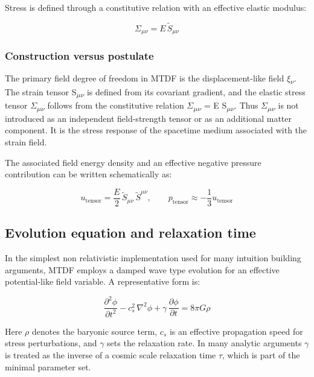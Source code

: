 \documentclass[11pt,a4paper]{article}
\begin{document}
Stress is defined through a constitutive relation with an effective elastic modulus:

\[
\Sigma_{\mu\nu} = E\,\tilde{S}_{\mu\nu}
\]

\begin{mdframed}[linecolor=accent,linewidth=0.5pt,backgroundcolor=callout-bg,leftline=true,rightline=true,topline=true,bottomline=true,innerleftmargin=8pt,innerrightmargin=8pt,innertopmargin=6pt,innerbottommargin=6pt]
\subsubsection{Construction versus postulate}
The primary field degree of freedom in MTDF is the displacement-like field $\xi$\textsubscript{$\nu$}. The strain tensor S\textsubscript{$\mu$$\nu$} is defined from its covariant gradient, and the elastic stress tensor $\Sigma$\textsubscript{$\mu$$\nu$} follows from the constitutive relation $\Sigma$\textsubscript{$\mu$$\nu$} = E S\textsubscript{$\mu$$\nu$}. Thus $\Sigma$\textsubscript{$\mu$$\nu$} is not introduced as an independent field-strength tensor or as an additional matter component. It is the stress response of the spacetime medium associated with the strain field.
\end{mdframed}

The associated field energy density and an effective negative pressure contribution can be written schematically as:

\[
u_\mathrm{tensor} = \frac{E}{2}\,\tilde{S}_{\mu\nu}\,\tilde{S}^{\mu\nu},\qquad
p_\mathrm{tensor} \approx -\frac{1}{3}u_\mathrm{tensor}
\]

\subsection{Evolution equation and relaxation time}
In the simplest non relativistic implementation used for many intuition building arguments, MTDF employs a damped wave type evolution for an effective potential-like field variable. A representative form is:

\[
\frac{\partial^2 \phi}{\partial t^2} - c_s^2\,\nabla^2\phi + \gamma\,\frac{\partial \phi}{\partial t} = 8\pi G\rho
\]

Here \(\rho\) denotes the baryonic source term, \(c_s\) is an effective propagation speed for stress perturbations, and \(\gamma\) sets the relaxation rate. In many analytic arguments \(\gamma\) is treated as the inverse of a cosmic scale relaxation time \(\tau\), which is part of the minimal parameter set.
\end{document}
